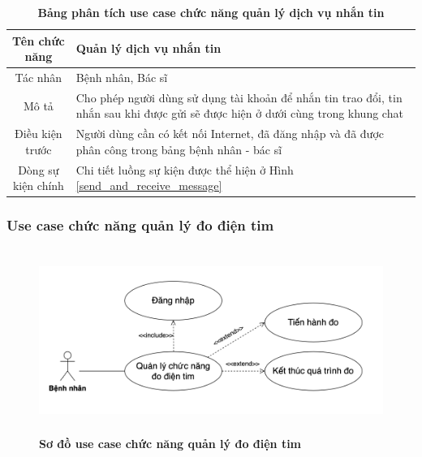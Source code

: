   \begin{table}[H]
    \caption{\bfseries \fontsize{12pt}{0pt}\selectfont Bảng phân tích use case chức năng quản lý dịch vụ nhắn tin}
    \centering
    \begin{tabularx}{0.9\textwidth}{|c|X|}
      \hline
      \textbf{Tên chức năng} & \textbf{Quản lý dịch vụ nhắn tin} \\
      \hline
      Tác nhân & Bệnh nhân, Bác sĩ \\
      \hline
      Mô tả & Cho phép người dùng sử dụng tài khoản để nhắn tin trao đổi, tin nhắn sau khi được gửi sẽ được
      hiện ở dưới cùng trong khung chat \\
      \hline
      Điều kiện trước & Người dùng cần có kết nối Internet, đã đăng nhập và đã được phân công trong bảng bệnh nhân - bác sĩ \\
      \hline
      Dòng sự kiện chính & 
        Chi tiết luồng sự kiện được thể hiện ở Hình \ref{send_and_receive_message}\\
      \hline
    \end{tabularx}
  \end{table}

\subsubsection{Use case chức năng quản lý đo điện tim}
  \begin{figure}[H]
    \centering
    \includegraphics[width=15cm,height=6cm]{Images/use_case/use_case_measure_ecg.png}
    \caption[Sơ đồ use case chức năng quản lý đo điện tim]{\bfseries \fontsize{12pt}{0pt}
    \selectfont Sơ đồ use case chức năng quản lý đo điện tim}
    \label{use_case_measure_ecg} %
  \end{figure}


